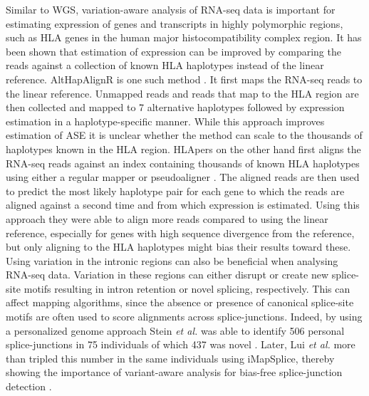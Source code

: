Similar to WGS, variation-aware analysis of RNA-seq data is important for estimating expression of genes and transcripts in highly polymorphic regions, such as HLA genes in the human major histocompatibility complex region. 
It has been shown that estimation of expression can be improved by comparing the reads against a collection of known HLA haplotypes instead of the linear reference. 
AltHapAlignR is one such method \cite{Lee_2018}. It first maps the RNA-seq reads to the linear reference. Unmapped reads and reads that map to the HLA region are then collected and mapped to 7 alternative haplotypes followed by expression estimation in a haplotype-specific manner. 
While this approach improves estimation of ASE it is unclear whether the method can scale to the thousands of haplotypes known in the HLA region.
HLApers on the other hand first aligns the RNA-seq reads against an index containing thousands of known HLA haplotypes using either a regular mapper or pseudoaligner \cite{Aguiar2019-fy}.
The aligned reads are then used to predict the most likely haplotype pair for each gene to which the reads are aligned against a second time and from which expression is estimated.  
Using this approach they were able to align more reads compared to using the linear reference, especially for genes with high sequence divergence from the reference, but only aligning to the HLA haplotypes might bias their results toward these. \\

Using variation in the intronic regions can also be beneficial when analysing RNA-seq data. 
Variation in these regions can either disrupt or create new splice-site motifs resulting in intron retention or novel splicing, respectively. 
This can affect mapping algorithms, since the absence or presence of canonical splice-site motifs are often used to score alignments across splice-junctions. 
Indeed, by using a personalized genome approach Stein \textit{et al.} was able to identify 506 personal splice-junctions in 75 individuals of which 437 was novel \cite{Stein_2015}. 
Later, Lui \textit{et al.} more than tripled this number in the same individuals using iMapSplice, thereby showing the importance of variant-aware analysis for bias-free splice-junction detection \cite{Liu_2018}.



